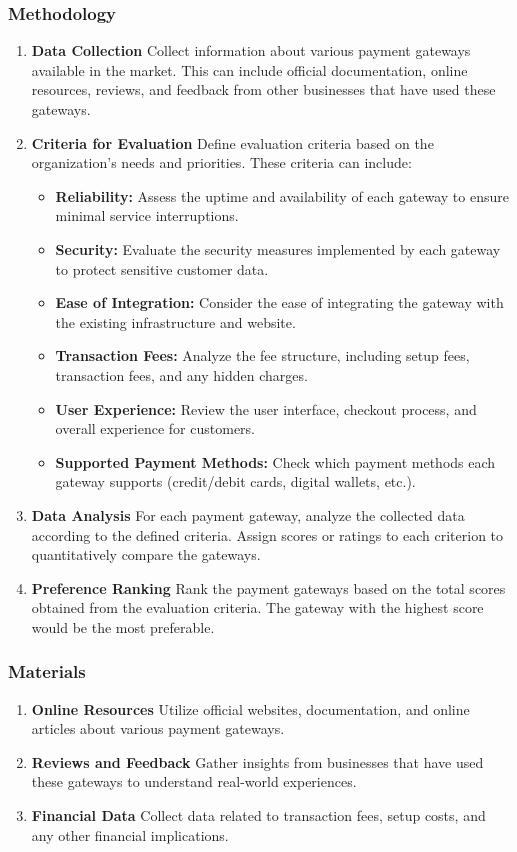 \subsubsection{Methodology}
\begin{enumerate}
\item \textbf{Data Collection}
Collect information about various payment gateways available in the market. This can include official documentation, online resources, reviews, and feedback from other businesses that have used these gateways.

\item \textbf{Criteria for Evaluation}
Define evaluation criteria based on the organization's needs and priorities. These criteria can include:
\begin{itemize}
    \item \textbf{Reliability:} Assess the uptime and availability of each gateway to ensure minimal service interruptions.
    \item \textbf{Security:} Evaluate the security measures implemented by each gateway to protect sensitive customer data.
    \item \textbf{Ease of Integration:} Consider the ease of integrating the gateway with the existing infrastructure and website.
    \item \textbf{Transaction Fees:} Analyze the fee structure, including setup fees, transaction fees, and any hidden charges.
    \item \textbf{User Experience:} Review the user interface, checkout process, and overall experience for customers.
    \item \textbf{Supported Payment Methods:} Check which payment methods each gateway supports (credit/debit cards, digital wallets, etc.).
\end{itemize}

\item \textbf{Data Analysis}
For each payment gateway, analyze the collected data according to the defined criteria. Assign scores or ratings to each criterion to quantitatively compare the gateways.

\item \textbf{Preference Ranking}
Rank the payment gateways based on the total scores obtained from the evaluation criteria. The gateway with the highest score would be the most preferable.
\end{enumerate}
\subsubsection{Materials}
\begin{enumerate}
\item \textbf{Online Resources}
Utilize official websites, documentation, and online articles about various payment gateways.

\item \textbf{Reviews and Feedback}
Gather insights from businesses that have used these gateways to understand real-world experiences.

\item \textbf{Financial Data}
Collect data related to transaction fees, setup costs, and any other financial implications.
\end{enumerate}
